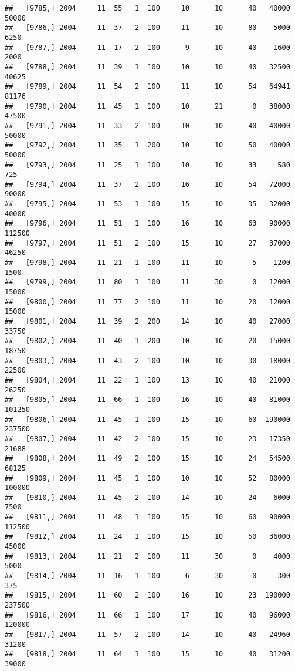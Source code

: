 \documentclass{article}\usepackage[]{graphicx}\usepackage[]{color}
\makeatletter
\newenvironment{kframe}{%
 \def\at@end@of@kframe{}%
 \ifinner\ifhmode%
  \def\at@end@of@kframe{\end{minipage}}%
  \begin{minipage}{\columnwidth}%
 \fi\fi%
 \def\FrameCommand##1{\hskip\@totalleftmargin \hskip-\fboxsep
 \colorbox{shadecolor}{##1}\hskip-\fboxsep
     \hskip-\linewidth \hskip-\@totalleftmargin \hskip\columnwidth}%
 \MakeFramed {\advance\hsize-\width
   \@totalleftmargin\z@ \linewidth\hsize
   \@setminipage}}%
 {\par\unskip\endMakeFramed%
 \at@end@of@kframe}
\newenvironment{knitrout}{}{} %
\makeatother
\begin{document}
\begin{knitrout}
\begin{kframe}
\begin{verbatim}
##   [9785,] 2004     11  55   1  100     10      10      40   40000   50000
##   [9786,] 2004     11  37   2  100     11      10      80    5000    6250
##   [9787,] 2004     11  17   2  100      9      10      40    1600    2000
##   [9788,] 2004     11  39   1  100     10      10      40   32500   40625
##   [9789,] 2004     11  54   2  100     11      10      54   64941   81176
##   [9790,] 2004     11  45   1  100     10      21       0   38000   47500
##   [9791,] 2004     11  33   2  100     10      10      40   40000   50000
##   [9792,] 2004     11  35   1  200     10      10      50   40000   50000
##   [9793,] 2004     11  25   1  100     10      10      33     580     725
##   [9794,] 2004     11  37   2  100     16      10      54   72000   90000
##   [9795,] 2004     11  53   1  100     15      10      35   32000   40000
##   [9796,] 2004     11  51   1  100     16      10      63   90000  112500
##   [9797,] 2004     11  51   2  100     15      10      27   37000   46250
##   [9798,] 2004     11  21   1  100     11      10       5    1200    1500
##   [9799,] 2004     11  80   1  100     11      30       0   12000   15000
##   [9800,] 2004     11  77   2  100     11      10      20   12000   15000
##   [9801,] 2004     11  39   2  200     14      10      40   27000   33750
##   [9802,] 2004     11  40   1  200     10      10      20   15000   18750
##   [9803,] 2004     11  43   2  100     10      10      30   18000   22500
##   [9804,] 2004     11  22   1  100     13      10      40   21000   26250
##   [9805,] 2004     11  66   1  100     16      10      40   81000  101250
##   [9806,] 2004     11  45   1  100     15      10      60  190000  237500
##   [9807,] 2004     11  42   2  100     15      10      23   17350   21688
##   [9808,] 2004     11  49   2  100     15      10      24   54500   68125
##   [9809,] 2004     11  45   1  100     10      10      52   80000  100000
##   [9810,] 2004     11  45   2  100     14      10      24    6000    7500
##   [9811,] 2004     11  48   1  100     15      10      60   90000  112500
##   [9812,] 2004     11  24   1  100     15      10      50   36000   45000
##   [9813,] 2004     11  21   2  100     11      30       0    4000    5000
##   [9814,] 2004     11  16   1  100      6      30       0     300     375
##   [9815,] 2004     11  60   2  100     16      10      23  190000  237500
##   [9816,] 2004     11  66   1  100     17      10      40   96000  120000
##   [9817,] 2004     11  57   2  100     14      10      40   24960   31200
##   [9818,] 2004     11  64   1  100     15      10      40   31200   39000

\end{verbatim}
\end{kframe}
\end{knitrout}
\end{document}
